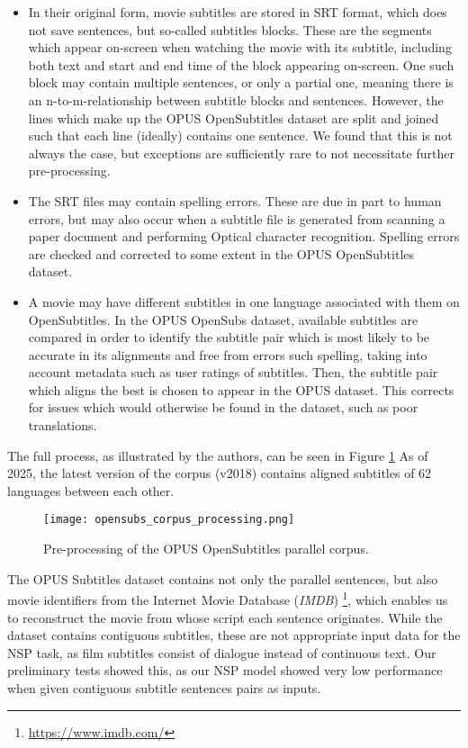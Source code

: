 \begin{itemize}
	\item
	      In their original form, movie subtitles are stored in SRT format, which does not save sentences, but so-called subtitles blocks.
	      These are the segments which appear on-screen when watching the movie with its subtitle, including both text and start and end time of the block appearing on-screen.
	      One such block may contain multiple sentences, or only a partial one, meaning there is an n-to-m-relationship between subtitle blocks and sentences.
	      However, the lines which make up the OPUS OpenSubtitles dataset are split and joined such that each line (ideally) contains one sentence.
	      We found that this is not always the case, but exceptions are sufficiently rare to not necessitate further pre-processing.
	\item The SRT files may contain spelling errors.
	      These are due in part to human errors, but may also occur when a subtitle file is generated from scanning a paper document and performing Optical character recognition.
	      Spelling errors are checked and corrected to some extent in the OPUS OpenSubtitles dataset.
	\item
	      A movie may have different subtitles in one language associated with them on OpenSubtitles.
	      In the OPUS OpenSubs dataset, available subtitles are compared in order to identify the subtitle pair which is most likely to be accurate in its alignments and free from errors such spelling, taking into account metadata such as user ratings of subtitles.
	      Then, the subtitle pair which aligns the best is chosen to appear in the OPUS dataset.
	      This corrects for issues which would otherwise be found in the dataset, such as poor translations.
\end{itemize}

The full process, as illustrated by the authors, can be seen in Figure \ref{fig:opensubtitles-pipeline}
As of 2025, the latest version of the corpus (v2018) contains aligned subtitles of 62 languages between each other.

\begin{figure}[ht]
	\centering
	\texttt{[image: opensubs\_corpus\_processing.png]}
	\caption{Pre-processing of the OPUS OpenSubtitles parallel corpus.}
	\label{fig:opensubtitles-pipeline}
\end{figure}

The OPUS Subtitles dataset contains not only the parallel sentences, but also movie identifiers from the Internet Movie Database (\textit{IMDB}) \footnote{\url{https://www.imdb.com/}}, which enables us to reconstruct the movie from whose script each sentence originates.
While the dataset contains contiguous subtitles, these are not appropriate input data for the NSP task, as film subtitles consist of dialogue instead of continuous text.
Our preliminary tests showed this, as our NSP model showed very low performance when given contiguous subtitle sentences pairs as inputs.

